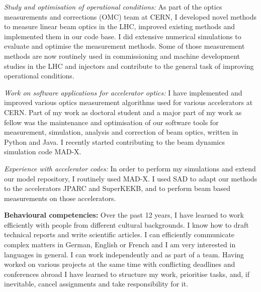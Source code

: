 \documentclass[10pt,a4paper,sans]{moderncv}        %
\begin{document}
    \emph{Study and optimisation of operational conditions:}
    As part of the optics measurements and corrections (OMC) team at CERN, I developed novel methods
    to measure linear beam optics in the LHC, improved existing methods and implemented them in our
    code base. I did extensive numerical simulations to evaluate and optimise the measurement methods.
    Some of those measurement methods are now routinely used in commissioning and machine development
    studies in the LHC and injectors and contribute to the general task of improving operational conditions.

    \emph{Work on software applications for accelerator optics:}
    I have implemented and improved various optics measurement algorithms used for various accelerators
    at CERN. Part of my work as doctoral student and a major part of my work as fellow was the
    maintenance and optimisation of our software tools for measurement, simulation, analysis and
    correction of beam optics, written in Python and Java.
    I recently started contributing to the beam dynamics simulation code MAD-X.

    \emph{Experience with accelerator codes:}
    In order to perform my simulations and extend our model repository, I routinely used MAD-X.
    I used SAD to adapt our methods to the accelerators JPARC and SuperKEKB, and to perform beam
    based measurements on those accelerators.

\textbf{Behavioural competencies:}
Over the past 12 years, I have learned to work efficiently with people from different cultural backgrounds.
I know how to draft technical reports and write scientific articles.
I can efficiently communicate complex matters in German, English or French
and I am very interested in languages in general.
I can work independently and as part of a team.
Having worked on various projects at the same time with conflicting deadlines and conferences abroad
I have learned to structure my work, prioritise tasks, and, if inevitable, cancel assignments and
take responsibility for it.

\vfill
\makeletterclosing

\end{document}
